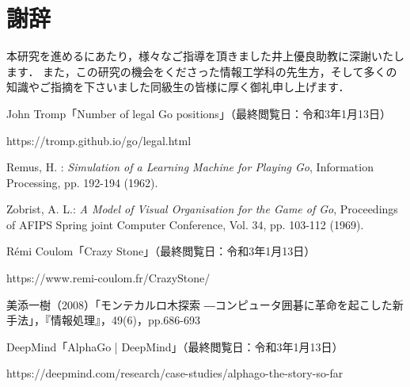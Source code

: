 \documentclass[openright]{nitocs}
\numberwithin{equation}{section}
\begin{document}
    \section*{謝辞} %
        本研究を進めるにあたり，様々なご指導を頂きました井上優良助教に深謝いたします．
        また，この研究の機会をくださった情報工学科の先生方，そして多くの知識やご指摘を下さいました同級生の皆様に厚く御礼申し上げます．
    

    \begin{thebibliography}{10} %


        John Tromp「Number of legal Go positions」（最終閲覧日：令和3年1月13日）

        https://tromp.github.io/go/legal.html

        Remus, H. : 
        {\it Simulation of a Learning Machine for Playing Go}, 
        Information Processing, 
        pp. 192-194 (1962). 

        Zobrist, A. L.: 
        {\it A Model of Visual Organisation for the Game of Go}, 
        Proceedings of AFIPS Spring joint Computer Conference, 
        Vol. 34, pp. 103-112 (1969). 

        Rémi Coulom「Crazy Stone」（最終閲覧日：令和3年1月13日）

        https://www.remi-coulom.fr/CrazyStone/

        美添一樹（2008）「モンテカルロ木探索 ―コンピュータ囲碁に革命を起こした新手法」，『情報処理』，49(6)，pp.686-693

        DeepMind「AlphaGo | DeepMind」（最終閲覧日：令和3年1月13日）
        
        https://deepmind.com/research/case-studies/alphago-the-story-so-far


\end{thebibliography}
\end{document}
